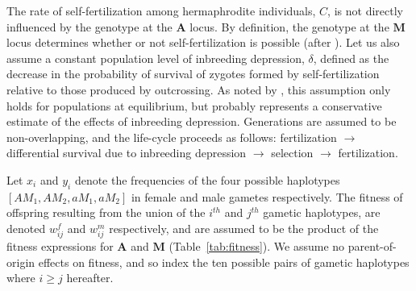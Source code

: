 \documentclass[9pt,twocolumn,twoside,lineno]{gsajnl}
\begin{document}
The rate of self-fertilization among hermaphrodite individuals, $C$, is not directly influenced by the genotype at the $\mathbf{A}$ locus. By definition, the genotype at the $\mathbf{M}$ locus determines whether or not self-fertilization is possible (after \citealt{Charlesworth1978a}). Let us also assume a constant population level of inbreeding depression, $\delta$, defined as the decrease in the probability of survival of zygotes formed by self-fertilization relative to those produced by outcrossing. As noted by \citet{Charlesworth1978a}, this assumption only holds for populations at equilibrium, but probably represents a conservative estimate of the effects of inbreeding depression. Generations are assumed to be non-overlapping, and the life-cycle proceeds as follows: fertilization $\rightarrow$ differential survival due to inbreeding depression $\rightarrow$ selection $\rightarrow$ fertilization.

Let $x_i$ and $y_i$ denote the frequencies of the four possible haplotypes $[AM_1,AM_2,aM_1,aM_2]$ in female and male gametes respectively. The fitness of offspring resulting from the union of the $i^{th}$ and $j^{th}$ gametic haplotypes, are denoted $w^f_{ij}$ and $w^m_{ij}$ respectively, and are assumed to be the product of the fitness expressions for $\mathbf{A}$ and $\mathbf{M}$ (Table~\ref{tab:fitness}). We assume no parent-of-origin effects on fitness, and so index the ten possible pairs of gametic haplotypes where $i \geq j$ hereafter.
\end{document}
